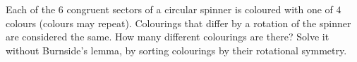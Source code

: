 Each of the $6$ congruent sectors of a circular spinner is coloured with one of $4$ colours (colours may repeat). Colourings that differ by a rotation of the spinner are considered the same. How many different colourings are there? Solve it without Burnside's lemma, by sorting colourings by their rotational symmetry.
